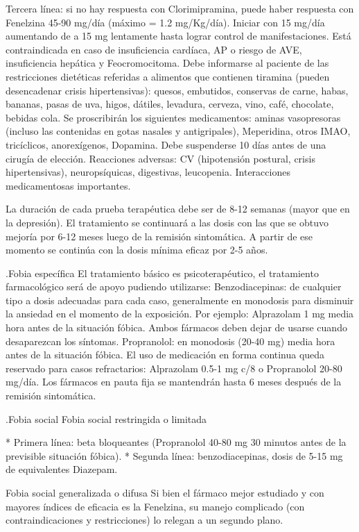 Tercera línea: si no hay respuesta con Clorimipramina, puede haber respuesta con Fenelzina 45-90 mg/día (máximo = 1.2 mg/Kg/día). Iniciar con 15 mg/día aumentando de a 15 mg lentamente hasta lograr control de manifestaciones. Está contraindicada en caso de insuficiencia cardíaca, AP o riesgo de AVE, insuficiencia hepática y Feocromocitoma. Debe informarse al paciente de las restricciones dietéticas referidas a alimentos que contienen tiramina (pueden desencadenar crisis hipertensivas): quesos, embutidos, conservas de carne, habas, bananas, pasas de uva, higos, dátiles, levadura, cerveza, vino, café, chocolate, bebidas cola. Se proscribirán los siguientes medicamentos: aminas vasopresoras (incluso las contenidas en gotas nasales y antigripales), Meperidina, otros IMAO, tricíclicos, anorexígenos, Dopamina. Debe suspenderse 10 días antes de una cirugía de elección. Reacciones adversas: CV (hipotensión postural, crisis hipertensivas), neuropsíquicas, digestivas, leucopenia. Interacciones medicamentosas importantes.

La duración de cada prueba terapéutica debe ser de 8-12 semanas (mayor que en la depresión). El tratamiento se continuará a las dosis con las que se obtuvo mejoría por 6-12 meses luego de la remisión sintomática. A partir de ese momento se continúa con la dosis mínima eficaz por 2-5 años.

.Fobia específica
El tratamiento básico es psicoterapéutico, el tratamiento farmacológico será de apoyo pudiendo utilizarse: Benzodiacepinas: de cualquier tipo a dosis adecuadas para cada caso, generalmente en monodosis para disminuir la ansiedad en el momento de la exposición. Por ejemplo: Alprazolam 1 mg media hora antes de la situación fóbica. Ambos fármacos deben dejar de usarse cuando desaparezcan los síntomas. Propranolol: en monodosis (20-40 mg) media hora antes de la situación fóbica. El uso de medicación en forma continua queda reservado para casos refractarios: Alprazolam 0.5-1 mg c/8 o Propranolol 20-80 mg/día. Los fármacos en pauta fija se mantendrán hasta 6 meses después de la remisión sintomática.

.Fobia social
Fobia social restringida o limitada

* Primera línea: beta bloqueantes (Propranolol 40-80 mg 30 minutos antes de la previsible situación fóbica).
* Segunda línea: benzodiacepinas, dosis de 5-15 mg de equivalentes Diazepam.

Fobia social generalizada o difusa Si bien el fármaco mejor estudiado y con mayores índices de eficacia es la Fenelzina, su manejo complicado (con contraindicaciones y restricciones) lo relegan a un segundo plano.

